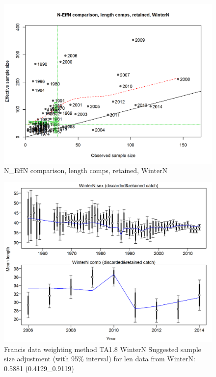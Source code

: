 \documentclass[12pt,]{article}
\begin{document}
\begin{figure}[htbp]
\centering
\includegraphics{./r4ss/plots_mod1/comp_lenfit_sampsize_flt1mkt2.png}
\caption{N\_EffN comparison, length comps, retained, WinterN
\label{fig:mod1_4_comp_lenfit_sampsize_flt1mkt2}}
\end{figure}

\begin{figure}[htbp]
\centering
\includegraphics{./r4ss/plots_mod1/comp_lenfit_data_weighting_TA1.8_WinterN.png}
\caption{Francis data weighting method TA1.8 WinterN Suggested sample
size adjustment (with 95\% interval) for len data from WinterN: 0.5881
(0.4129\_0.9119)
\label{fig:mod1_5_comp_lenfit_data_weighting_TA1.8_WinterN}}
\end{figure}
\end{document}
